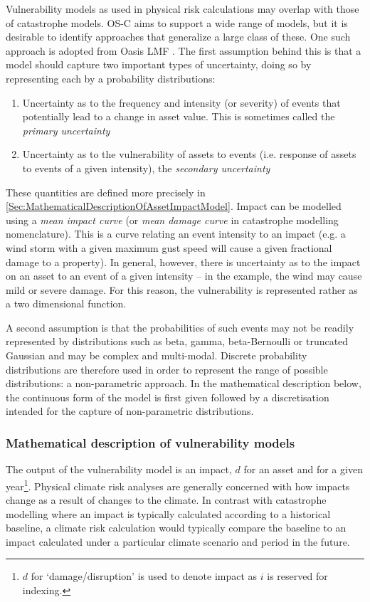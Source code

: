 \documentclass[a4paper,11pt]{extarticle} %
\theoremstyle{definition}
\begin{document}
Vulnerability models as used in physical risk calculations may overlap with those of catastrophe models. OS-C aims to support a wide range of models, but it is desirable to identify approaches that generalize a large class of these. One such approach is adopted from Oasis LMF \cite{OasisLMF}. The first assumption behind this is that a model should capture two important types of uncertainty, doing so by representing each by a probability distributions:
\begin{enumerate}
    \item Uncertainty as to the frequency and intensity (or severity) of events that potentially lead to a change in asset value. This is sometimes called the {\it primary uncertainty}
    \item Uncertainty as to the vulnerability of assets to events (i.e. response of assets to events of a given intensity), the {\it secondary uncertainty}
\end{enumerate}

These quantities are defined more precisely in \ref{Sec:MathematicalDescriptionOfAssetImpactModel}. Impact can be modelled using a {\it mean impact curve} (or {\it mean damage curve} in catastrophe modelling nomenclature). This is a curve relating an event intensity to an impact (e.g. a wind storm with a given maximum gust speed will cause a given fractional damage to a property). In general, however, there is uncertainty as to the impact on an asset to an event of a given intensity -- in the example, the wind may cause mild or severe damage. For this reason, the vulnerability is represented rather as a two dimensional function.

A second assumption is that the probabilities of such events may not be readily represented by distributions such as beta, gamma, beta-Bernoulli or truncated Gaussian and may be complex and multi-modal. Discrete probability distributions are therefore used in order to represent the range of possible distributions: a non-parametric approach. In the mathematical description below, the continuous form of the model is first given followed by a discretisation intended for the capture of non-parametric distributions.

\subsubsection{Mathematical description of vulnerability models}
The output of the vulnerability model is an impact, $d$ for an asset and for a given year\footnote{$d$ for `damage/disruption' is used to denote impact as $i$ is reserved for indexing.}. Physical climate risk analyses are generally concerned with how impacts change as a result of changes to the climate. In contrast with catastrophe modelling where an impact is typically calculated according to a historical baseline, a climate risk calculation would typically compare the baseline to an impact calculated under a particular climate scenario and period in the future.
\end{document}
